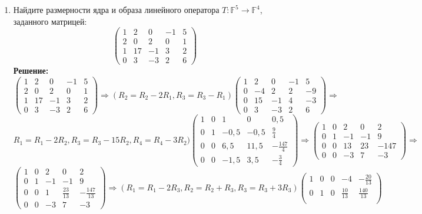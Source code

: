 \documentclass[]{book}
\theoremstyle{definition}
\newcommand{\bb}[1]{\mathbb{#1}}
\begin{document}
\begin{enumerate}[resume]
\item Найдите размерности ядра и образа линейного оператора $T: \bb{F}^5 \rightarrow \bb{F}^4$, заданного матрицей:
$$
\begin{pmatrix} 
1 & 2 & 0 & -1 & 5 \\
2 & 0 & 2 & 0 & 1 \\
1 & 17 & -1 & 3 & 2 \\
0 & 3 & -3 & 2 & 6 
\end{pmatrix} $$
\textbf{Решение:}
$$
\begin{pmatrix} 
1 & 2 & 0 & -1 & 5 \\
2 & 0 & 2 & 0 & 1 \\
1 & 17 & -1 & 3 & 2 \\
0 & 3 & -3 & 2 & 6 
\end{pmatrix} 
\Longrightarrow (R_2 = R_2-2R_1, R_3=R_3-R_1) 
\begin{pmatrix} 
1 & 2 & 0 & -1 & 5 \\
0 & -4 & 2 & 2 & -9 \\
0 & 15 & -1 & 4 & -3 \\
0 & 3 & -3 & 2 & 6 
\end{pmatrix}
\Longrightarrow$$
$$
R_1 = R_1-2R_2, R_3 = R_3 - 15R_2, R_4 = R_4-3R_2)
\begin{pmatrix} 
1 & 0 & 1 & 0 & 0,5 \\
0 & 1 & -0,5 & -0,5 & \frac{9}{4} \\
0 & 0 & 6,5 & 11,5 & -\frac{147}{4} \\
0 & 0 & -1,5 & 3,5 & -\frac{3}{4} 
\end{pmatrix} 
\Longrightarrow 
\begin{pmatrix} 
1 & 0 & 2 & 0 & 2 \\
0 & 1 & -1 & -1 & 9\\
0 & 0 & 13 & 23 & -147 \\
0 & 0 & -3 & 7 & -3 
\end{pmatrix} 
\Longrightarrow$$
$$
\begin{pmatrix} 
1 & 0 & 2 & 0 & 2 \\
0 & 1 & -1 & -1 & 9\\
0 & 0 & 1 & \frac{23}{13} & -\frac{147}{13}\\
0 & 0 & -3 & 7 & -3 
\end{pmatrix} 
\Longrightarrow (R_1 = R_1-2R_3, R_2 = R_2 +R_3, R_3 = R_3 +3R_3) 
\begin{pmatrix} 
1 & 0 & 0 & -4 & -\frac{20}{13} \\
0 & 1 & 0 & \frac{10}{13} & \frac{140}{13}\\

\end{pmatrix}$$
\end{enumerate}
\end{document}
